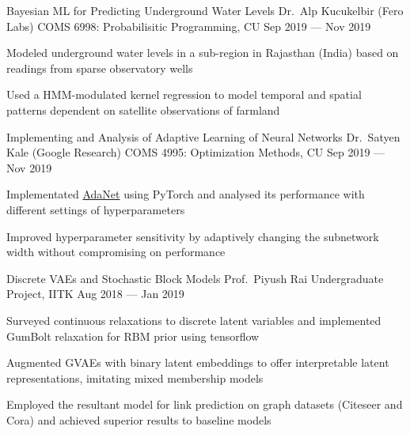 

\cventry
	{Bayesian ML for Predicting Underground Water Levels}
    {Dr.\ Alp Kucukelbir (Fero Labs)}
	{COMS 6998: Probabilisitic Programming, CU}
	{Sep 2019 --- Nov 2019}
	{%
		\begin{cvitems}
			\item Modeled underground water levels in a sub-region in Rajasthan (India) based on readings from sparse observatory wells
			\item Used a HMM-modulated kernel regression to model temporal and spatial patterns dependent on satellite observations of farmland
		\end{cvitems}
	}

\cventry
	{Implementing and Analysis of Adaptive Learning of Neural Networks}
	{Dr.\ Satyen Kale (Google Research)}
	{COMS 4995: Optimization Methods, CU}
	{Sep 2019 --- Nov 2019}
	{%
		\begin{cvitems}
			\item Implementated \href{https://arxiv.org/abs/1607.01097}{AdaNet} using PyTorch and analysed its performance with different settings of hyperparameters
			\item Improved hyperparameter sensitivity by adaptively changing the subnetwork width without compromising on performance
		\end{cvitems}
	}

\cventry
	{Discrete VAEs and Stochastic Block Models}
	{Prof.\ Piyush Rai}
	{Undergraduate Project, IITK}
	{Aug 2018 --- Jan 2019}
	{%
		\begin{cvitems}
			\item Surveyed continuous relaxations to discrete latent variables and implemented GumBolt relaxation for RBM prior using tensorflow
			\item Augmented GVAEs with binary latent embeddings to offer interpretable latent representations, imitating mixed membership models
			\item Employed the resultant model for link prediction on graph datasets (Citeseer and Cora) and achieved superior results to baseline models
		\end{cvitems}
	}

